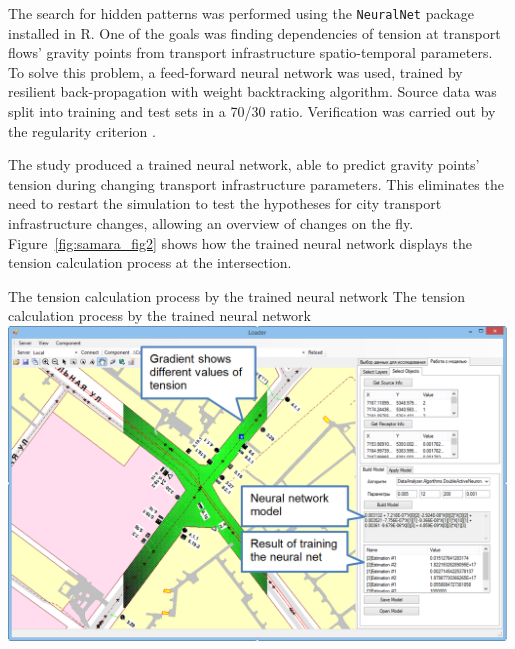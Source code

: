 The search for hidden patterns was performed using the \lstinline|NeuralNet| package installed in R. One of the goals was finding dependencies of tension at transport flows' gravity points from transport infrastructure spatio-temporal parameters. To solve this problem, a feed-forward neural network was used, trained by resilient back-propagation with weight backtracking algorithm. Source data was split into training and test sets in a 70/30 ratio. Verification was carried out by the regularity criterion \citep[][]{MikheevaEtAl_2012}.

The study produced a trained neural network, able to predict gravity points' tension during changing transport infrastructure parameters. This eliminates the need to restart the simulation to test the hypotheses for city transport infrastructure changes, allowing an overview of changes on the fly. Figure~\ref{fig:samara_fig2} shows how the trained neural network displays the tension calculation process at the intersection.

\createfigure%
{The tension calculation process by the trained neural network}%
{The tension calculation process by the trained neural network}%
{\label{fig:samara_fig2}}%
{\includegraphics[width=0.99\textwidth, angle=0]{./scenarios/figures/samara_fig2.png}}%
{}

